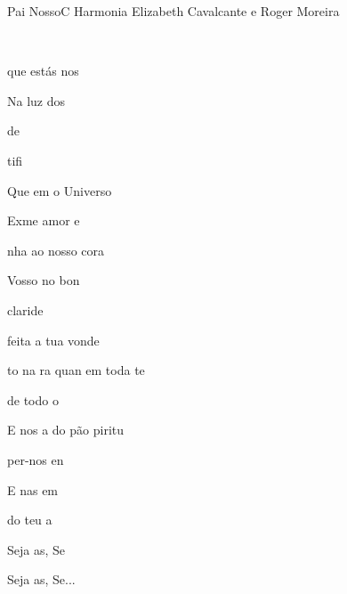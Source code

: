 \documentclass[a4,12pt,oneside]{book}
\newcommand{\RevDate}{\today}
\newcommand{\NotCCLIed}{\relax}
\begin{document}
\begin{song}{Pai Nosso}{C}
  {Harmonia}
  {Elizabeth Cavalcante e Roger Moreira}
  {}
  {\NotCCLIed}
  
	\renewcommand{\RevDate}{12 de maio de 2014}
  

	\ifChordBk
    	{\vspace{-1em}\flushright{\Cchord \quad \Amchord \quad \AmGchord \quad \Aschord \quad \dchord \quad \DmCchord \quad \Gschord}\\}
    	\vspace{-3em}
	\fi
	
    \begin{minipage}{0.5\textwidth}
		\ifChordBk
	  		\vspace{2em}
	  	\fi
  		
    	 que estás nos 
	
	    Na luz dos 
	
    	 de   
	
	    tifi 
	
    	Que em  o Universo
	    
	    Exme amor e 
	
    	nha ao nosso cora
	
	    Vosso no  bon
	
    	  claride
	
    \end{minipage}

	\ifChordBk
     {\vspace{-4cm}}
    \fi

    \flushright{}

    \begin{minipage}{0.5\textwidth}
        \vfill

    	 feita a tua vonde
	
	    to na ra quan em toda te
	
    	 de  todo o  
	
	    E nos  a  do pão piritu
	
    	 per-nos en 
	
	    E  nas em 

    	  do teu a 
	
	    Seja as,  Se 
	
    	Seja as,  Se...
    \end{minipage}

\end{song}
\end{document}
